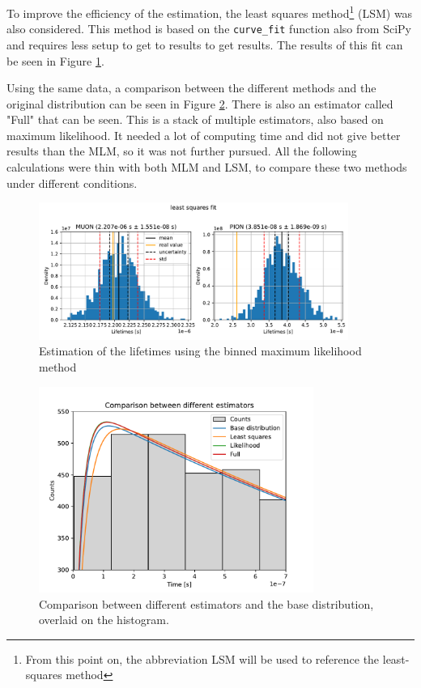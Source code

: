 \documentclass[11pt, a4paper, oneside]{book}
\newcommand\Plotwidth{0.8}
\newcommand\DoublePlotwidth{0.9}
\begin{document}
To improve the efficiency of the estimation, the least squares method\footnote{From this point on, the abbreviation LSM will be used to reference the least-squares method} (LSM) was also considered. This method is based on the \lstinline{curve_fit} function also from SciPy and requires less setup to get to results to get results. The results of this fit can be seen in Figure \ref{fig:least_squares_results}.

Using the same data, a comparison between the different methods and the original distribution can be seen in Figure \ref{fig:comparison_estimators}. There is also an estimator called "Full" that can be seen. This is a stack of multiple estimators, also based on maximum likelihood. It needed a lot of computing time and did not give better results than the MLM, so it was not further pursued. All the following calculations were thin with both MLM and LSM, to compare these two methods under different conditions.

\begin{figure}[h]
  \centering
  \includegraphics[width=\DoublePlotwidth\textwidth]{images/estimators_hist_least_squares.pdf}
  \caption{Estimation of the lifetimes using the binned maximum likelihood method}
  \label{fig:least_squares_results}
\end{figure}

\begin{figure}[h]
    \centering
    \includegraphics[width=\Plotwidth\textwidth]{images/comparison_estimators_150bins.pdf}
    \caption{Comparison between different estimators and the base distribution, overlaid on the histogram.}
    \label{fig:comparison_estimators}
\end{figure}
\end{document}
